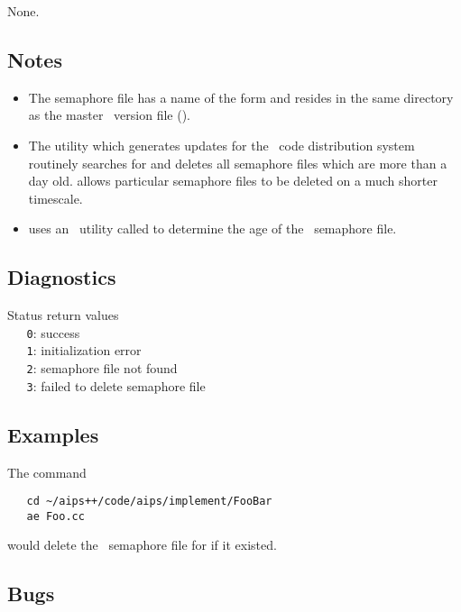 None.

\subsection*{Notes}

\begin{itemize}
\item
   The semaphore file has a name of the form  and resides in the
   same directory as the master \rcs\ version file ().

\item
   The utility which generates updates for the \aipspp\ code distribution
   system  routinely searches for and deletes all
   semaphore files which are more than a day old.   allows particular
   semaphore files to be deleted on a much shorter timescale.

\item
    uses an \aipspp\ utility called  to
   determine the age of the \rcs\ semaphore file.
\end{itemize}

\subsection*{Diagnostics}

Status return values
\\ \verb+   0+: success
\\ \verb+   1+: initialization error
\\ \verb+   2+: semaphore file not found
\\ \verb+   3+: failed to delete semaphore file

\subsection*{Examples}

The command

\begin{verbatim}
   cd ~/aips++/code/aips/implement/FooBar
   ae Foo.cc
\end{verbatim}

\noindent
would delete the \rcs\ semaphore file for  if it existed.

\subsection*{Bugs}

